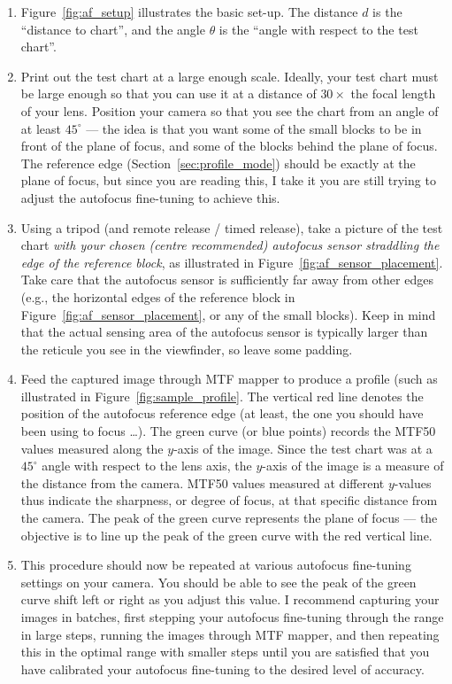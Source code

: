 \documentclass[a4paper]{article}
\begin{document}
\begin{enumerate}
    \item Figure~\ref{fig:af_setup} illustrates the basic set-up. The
distance $d$ is the ``distance to chart'', and the angle $\theta$ is the
``angle with respect to the test chart''.
    \item Print out the test chart at a large enough scale. Ideally, your
test chart must be large enough so that you can use it at a distance of
$30\times$ the focal length of your lens. Position your camera so that you
see the chart from an angle of at least $45^\circ$ --- the idea is that you
want some of the small blocks to be in front of the plane of focus, and some
of the blocks behind the plane of focus. The reference edge
(Section~\ref{sec:profile_mode}) should be
exactly at the plane of focus, but since you are reading this, I take it you
are still trying to adjust the autofocus fine-tuning to achieve this.
    \item Using a tripod (and remote release / timed release), take a
picture of the test chart \emph{with your chosen (centre recommended)
autofocus sensor straddling the edge of the reference block}, as illustrated
in Figure~\ref{fig:af_sensor_placement}. Take care that the autofocus sensor
is sufficiently far away from other edges (e.g., the horizontal edges of the
reference block in Figure~\ref{fig:af_sensor_placement}, or any of the small
blocks). Keep in mind that the actual sensing area of the autofocus sensor
is typically larger than the reticule you see in the viewfinder, so leave
some padding.
    \item Feed the captured image through MTF mapper to produce a profile
(such as illustrated in Figure~\ref{fig:sample_profile}. The vertical red
line denotes the position of the autofocus reference edge (at least, the one
you should have been using to focus \ldots). The green curve (or blue
points) records the MTF50 values measured along the $y$-axis of the image.
Since the test chart was at a $45^\circ$ angle with respect to the lens
axis, the $y$-axis of the image is a measure of the distance from the
camera. MTF50 values measured at different $y$-values thus indicate the
sharpness, or degree of focus, at that specific distance from the camera.
The peak of the green curve represents the plane of focus --- the objective
is to line up the peak of the green curve with the red vertical line.
    \item This procedure should now be repeated at various autofocus
fine-tuning settings on your camera. You should be able to see the peak of
the green curve shift left or right as you adjust this value. I recommend
capturing your images in batches, first stepping your autofocus fine-tuning
through the range in large steps, running the images through MTF mapper, and
then repeating this in the optimal range with smaller steps until you are
satisfied that you have calibrated your autofocus fine-tuning to the desired
level of accuracy.
\end{enumerate}
\end{document}
